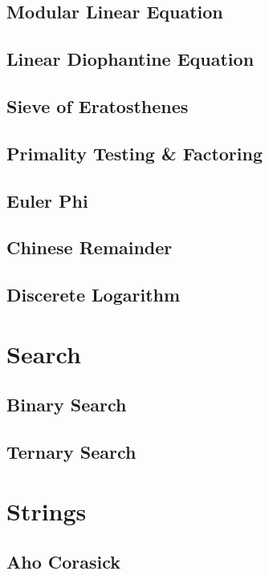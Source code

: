 		\subsection{Modular Linear Equation}
			
		\subsection{Linear Diophantine Equation}
			
		\subsection{Sieve of Eratosthenes}
			
		\subsection{Primality Testing \& Factoring}
			
		\subsection{Euler Phi}
			
		\subsection{Chinese Remainder}
			
		\subsection{Discerete Logarithm}
			
	\section{Search}
		\subsection{Binary Search}
			
		\subsection{Ternary Search}
			
	\section{Strings}
		\subsection{Aho Corasick}
			
